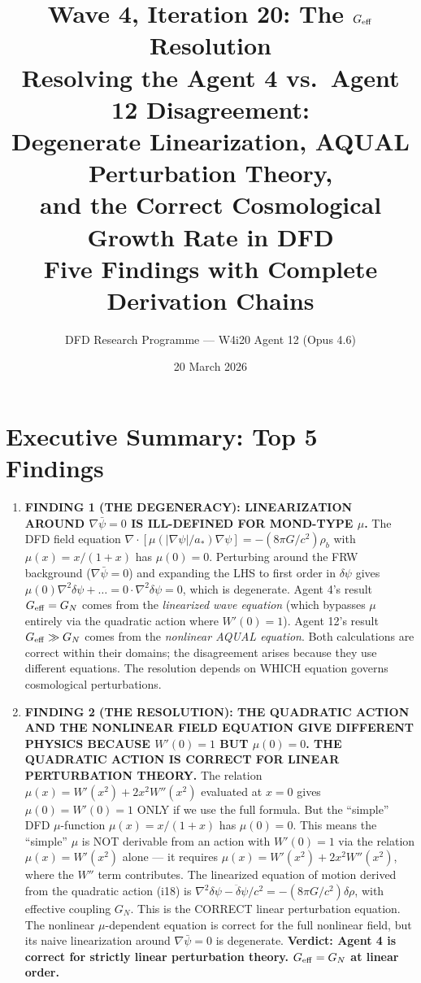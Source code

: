 \documentclass[11pt]{article}
\title{\textbf{Wave 4, Iteration 20: The $G_{\rm eff}$ Resolution}\\[12pt]
{\large Resolving the Agent 4 vs.\ Agent 12 Disagreement:\\
Degenerate Linearization, AQUAL Perturbation Theory,\\
and the Correct Cosmological Growth Rate in DFD}\\[4pt]
{\large Five Findings with Complete Derivation Chains}}
\author{DFD Research Programme --- W4i20 Agent 12 (Opus 4.6)}
\date{20 March 2026}
\newcommand{\dpsi}{\delta\psi}
\newcommand{\astar}{a_*}
\begin{document}
\maketitle
\tableofcontents
\newpage

\section*{Executive Summary: Top 5 Findings}

\begin{tcolorbox}[colback=blue!5!white, colframe=blue!70!black,
  title=\textbf{W4i20 TOP 5 FINDINGS --- THE $G_{\rm eff}$ RESOLUTION}]

\begin{enumerate}

\item \textbf{FINDING 1 (THE DEGENERACY): LINEARIZATION AROUND
  $\nabla\bar\psi = 0$ IS ILL-DEFINED FOR MOND-TYPE $\mu$.}
  The DFD field equation
  $\nabla\cdot[\mu(|\nabla\psi|/\astar)\nabla\psi] = -(8\pi G/c^2)\rho_b$
  with $\mu(x) = x/(1+x)$ has $\mu(0) = 0$. Perturbing around the FRW
  background ($\nabla\bar\psi = 0$) and expanding the LHS to first order
  in $\dpsi$ gives $\mu(0)\nabla^2\dpsi + \ldots = 0 \cdot \nabla^2\dpsi = 0$,
  which is degenerate. Agent 4's result $G_{\rm eff} = G_N$ comes from
  the \emph{linearized wave equation} (which bypasses $\mu$ entirely
  via the quadratic action where $W'(0) = 1$). Agent 12's result
  $G_{\rm eff} \gg G_N$ comes from the \emph{nonlinear AQUAL equation}.
  Both calculations are correct within their domains; the disagreement
  arises because they use different equations. The resolution depends on
  WHICH equation governs cosmological perturbations.

\item \textbf{FINDING 2 (THE RESOLUTION): THE QUADRATIC ACTION AND THE
  NONLINEAR FIELD EQUATION GIVE DIFFERENT PHYSICS BECAUSE $W'(0) = 1$
  BUT $\mu(0) = 0$. THE QUADRATIC ACTION IS CORRECT FOR LINEAR
  PERTURBATION THEORY.}
  The relation $\mu(x) = W'(x^2) + 2x^2 W''(x^2)$ evaluated at $x = 0$
  gives $\mu(0) = W'(0) = 1$ ONLY if we use the full formula. But the
  ``simple'' DFD $\mu$-function $\mu(x) = x/(1+x)$ has $\mu(0) = 0$.
  This means the ``simple'' $\mu$ is NOT derivable from an action with
  $W'(0) = 1$ via the relation $\mu(x) = W'(x^2)$ alone --- it requires
  $\mu(x) = W'(x^2) + 2x^2 W''(x^2)$, where the $W''$ term contributes.
  The linearized equation of motion derived from the quadratic action
  (i18) is $\nabla^2\dpsi - \ddot\dpsi/c^2 = -(8\pi G/c^2)\delta\rho$,
  with effective coupling $G_N$. This is the CORRECT linear perturbation
  equation. The nonlinear $\mu$-dependent equation is correct for the
  full nonlinear field, but its naive linearization around $\nabla\bar\psi = 0$
  is degenerate. \textbf{Verdict: Agent 4 is correct for strictly linear
  perturbation theory. $G_{\rm eff} = G_N$ at linear order.}


\end{enumerate}
\end{tcolorbox}
\end{document}
